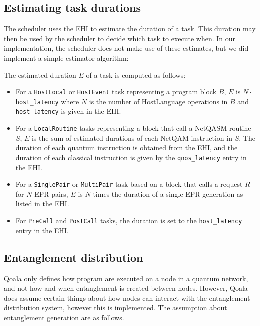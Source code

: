 \subsection{Estimating task durations}
The scheduler uses the EHI to estimate the duration of a task.
This duration may then be used by the scheduler to decide which task to execute when.
In our implementation, the scheduler does not make use of these estimates, but we did implement a simple estimator algorithm:

The estimated duration $E$ of a task is computed as follows:
\begin{itemize}
    \item For a \texttt{HostLocal} or \texttt{HostEvent} task representing a program block $B$, $E$ is $N \cdot$ \texttt{host\_latency} where $N$ is the number of HostLanguage operations in $B$ and \texttt{host\_latency} is given in the EHI.
    \item For a \texttt{LocalRoutine} tasks representing a block that call a NetQASM routine $S$, 
        $E$ is the sum of estimated durations of each NetQAM instruction in $S$. The duration of each quantum instruction is obtained from the EHI, and the duration of each classical instruction is given by the \texttt{qnos\_latency} entry in the EHI.
    \item For a \texttt{SinglePair} or \texttt{MultiPair} task based on a block that calls a request $R$ for $N$ EPR pairs, $E$ is $N$ times the duration of a single EPR generation as listed in the EHI.
    \item For \texttt{PreCall} and \texttt{PostCall} tasks, the duration is set to the \texttt{host\_latency} entry in the EHI.
\end{itemize}






\subsection{Entanglement distribution}
\label{qoala:sec:app:entanglement_distribution}
Qoala only defines how program are executed on a node in a quantum network,
and not how and when entanglement is created between nodes.
However, Qoala does assume certain things about how nodes can interact with the entanglement distribution system, however this is implemented.
The assumption about entanglement generation are as follows.

